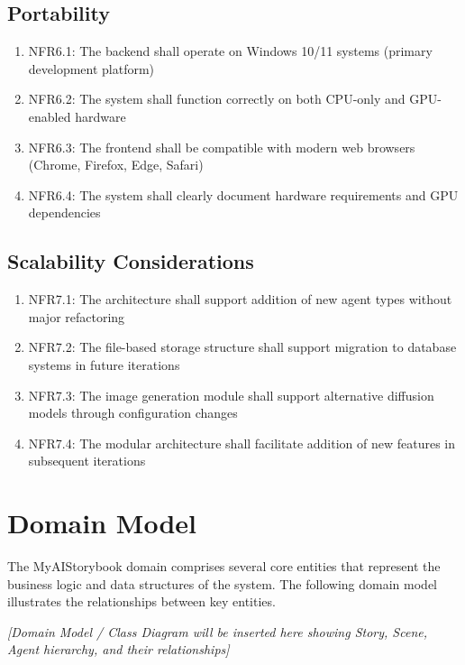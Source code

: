 \subsection{Portability}
\begin{enumerate}
    \item NFR6.1: The backend shall operate on Windows 10/11 systems (primary development platform)
    \item NFR6.2: The system shall function correctly on both CPU-only and GPU-enabled hardware
    \item NFR6.3: The frontend shall be compatible with modern web browsers (Chrome, Firefox, Edge, Safari)
    \item NFR6.4: The system shall clearly document hardware requirements and GPU dependencies
\end{enumerate}

\subsection{Scalability Considerations}
\begin{enumerate}
    \item NFR7.1: The architecture shall support addition of new agent types without major refactoring
    \item NFR7.2: The file-based storage structure shall support migration to database systems in future iterations
    \item NFR7.3: The image generation module shall support alternative diffusion models through configuration changes
    \item NFR7.4: The modular architecture shall facilitate addition of new features in subsequent iterations
\end{enumerate}

\section{Domain Model}
The MyAIStorybook domain comprises several core entities that represent the business logic and data structures of the system. The following domain model illustrates the relationships between key entities.

\vspace{3cm}
\begin{center}
\textit{[Domain Model / Class Diagram will be inserted here showing Story, Scene, Agent hierarchy, and their relationships]}
\end{center}
\vspace{3cm}

